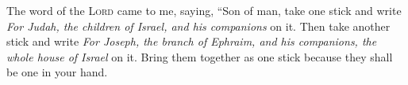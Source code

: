 
\begin{inparaenum}
   The word of the \textsc{Lord} came to me, saying,%
   ``Son of man, take one stick and write \textit{For Judah, the children of Israel, and his companions} on it. Then take another stick and write \textit{For Joseph, the branch of Ephraim, and his companions, the whole house of Israel} on it.%
   Bring them together as one stick because they shall be one in your hand.%
\end{inparaenum}
